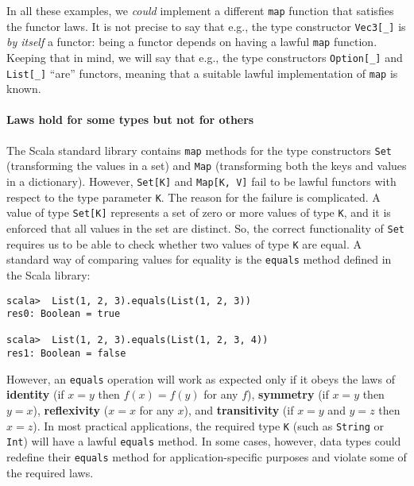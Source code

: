 In all these examples, we \emph{could} implement a different \lstinline!map!
function that satisfies the functor laws. It is not precise to say
that e.g., the type constructor \lstinline!Vec3[_]! is \emph{by itself}
a functor: being a functor depends on having a lawful \lstinline!map!
function. Keeping that in mind, we will say that e.g., the type constructors
\lstinline!Option[_]! and \lstinline!List[_]! \textsf{``}are\textsf{''} functors,
meaning that a suitable lawful implementation of \lstinline!map!
is known.

\paragraph{Laws hold for some types but not for others}

The Scala standard library contains \lstinline!map! methods for the
type constructors \lstinline!Set! (transforming the values in a set)
and \lstinline!Map! (transforming both the keys and values in a dictionary).
However, \lstinline!Set[K]! and \lstinline!Map[K, V]! fail to be
lawful functors with respect to the type parameter \lstinline!K!.
The reason for the failure is complicated. A value of type \lstinline!Set[K]!
represents a set of zero or more values of type \lstinline!K!, and
it is enforced that all values in the set are distinct. So, the correct
functionality of \lstinline!Set! requires us to be able to\emph{
}check whether two values of type \lstinline!K! are equal. A standard
way of comparing values for equality is the \lstinline!equals! method
defined in the Scala library:
\begin{lstlisting}
scala>  List(1, 2, 3).equals(List(1, 2, 3))
res0: Boolean = true

scala>  List(1, 2, 3).equals(List(1, 2, 3, 4))
res1: Boolean = false
\end{lstlisting}
However, an \lstinline!equals! operation will work as expected only
if it obeys the \label{par:label-equality-laws}laws of \textbf{identity}
(if $x=y$ then $f(x)=f(y)$ for any $f$), \textbf{symmetry} (if
$x=y$ then $y=x$), \textbf{reflexivity}
($x=x$ for any $x$), and \textbf{transitivity}
(if $x=y$ and $y=z$ then $x=z$). In most practical applications,
the required type \lstinline!K! (such as \lstinline!String! or \lstinline!Int!)
will have a lawful \lstinline!equals! method. In some cases, however,
data types could redefine their \lstinline!equals! method for application-specific
purposes and violate some of the required laws.

